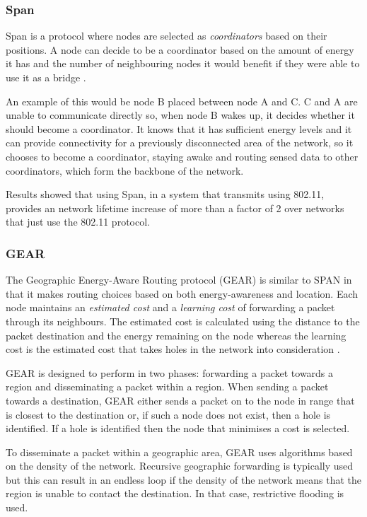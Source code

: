 \subsubsection{Span}
	Span is a protocol where nodes are selected as \textit{coordinators} based on their positions. A node can decide to be a coordinator based on the amount of energy it has and the number of neighbouring nodes it would benefit if they were able to use it as a bridge \cite{Chen2002}.

An example of this would be node B placed between node A and C. C and A are unable to communicate directly so, when node B wakes up, it decides whether it should become a coordinator. It knows that it has sufficient energy levels and it can provide connectivity for a previously disconnected area of the network, so it chooses to become a coordinator, staying awake and routing sensed data to other coordinators, which form the backbone of the network.

Results showed that using Span, in a system that transmits using 802.11, provides an network lifetime increase of more than a factor of 2 over networks that just use the 802.11 protocol.

\subsubsection{GEAR}
The Geographic Energy-Aware Routing protocol (GEAR) is similar to SPAN in that it makes routing choices based on both energy-awareness and location. Each node maintains an \textit{estimated cost} and a \textit{learning cost} of forwarding a packet through its neighbours. The estimated cost is calculated using the distance to the packet destination and the energy remaining on the node whereas the learning cost is the estimated cost that takes holes in the network into consideration \cite{Yu2001}. 

GEAR is designed to perform in two phases: forwarding a packet towards a region and disseminating a packet within a region. When sending a packet towards a destination, GEAR either sends a packet on to the node in range that is closest to the destination or, if such a node does not exist, then a hole is identified. If a hole is identified then the node that minimises a cost is selected.

To disseminate a packet within a geographic area, GEAR uses algorithms based on the density of the network. Recursive geographic forwarding is typically used but this can result in an endless loop if the density of the network means that the region is unable to contact the destination. In that case, restrictive flooding is used.

